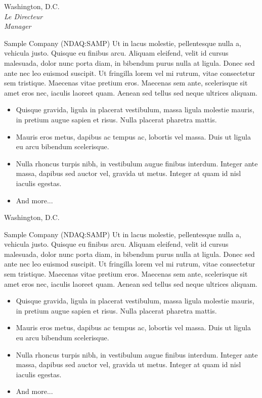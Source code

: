 \documentclass[letterpaper,10pt,final]{memoir}
\begin{document}
{ \hfill Washington, D.C.\\
\vspace{0mm}
		\textit{\hspace{5mm} Le Directeur}\\
\vspace{0mm}
        \textit{\hspace{5mm} Manager}\\
\par Sample Company (NDAQ:SAMP) Ut in lacus molestie, pellentesque nulla a, vehicula justo. Quisque eu finibus arcu. Aliquam eleifend, velit id cursus malesuada, dolor nunc porta diam, in bibendum purus nulla at ligula. Donec sed ante nec leo euismod suscipit. Ut fringilla lorem vel mi rutrum, vitae consectetur sem tristique. Maecenas vitae pretium eros. Maecenas sem ante, scelerisque sit amet eros nec, iaculis laoreet quam. Aenean sed tellus sed neque ultrices aliquam.
\begin{itemize}
\item Quisque gravida, ligula in placerat vestibulum, massa ligula molestie mauris, in pretium augue sapien et risus. Nulla placerat pharetra mattis.
\item Mauris eros metus, dapibus ac tempus ac, lobortis vel massa. Duis ut ligula eu arcu bibendum scelerisque.
\item Nulla rhoncus turpis nibh, in vestibulum augue finibus interdum. Integer ante massa, dapibus sed auctor vel, gravida ut metus. Integer at quam id nisl iaculis egestas.
\item And more...
\end{itemize}
\SmallSep

 \hfill Washington, D.C.\\
\par Sample Company (NDAQ:SAMP) Ut in lacus molestie, pellentesque nulla a, vehicula justo. Quisque eu finibus arcu. Aliquam eleifend, velit id cursus malesuada, dolor nunc porta diam, in bibendum purus nulla at ligula. Donec sed ante nec leo euismod suscipit. Ut fringilla lorem vel mi rutrum, vitae consectetur sem tristique. Maecenas vitae pretium eros. Maecenas sem ante, scelerisque sit amet eros nec, iaculis laoreet quam. Aenean sed tellus sed neque ultrices aliquam.
\begin{itemize}
\item Quisque gravida, ligula in placerat vestibulum, massa ligula molestie mauris, in pretium augue sapien et risus. Nulla placerat pharetra mattis.
\item Mauris eros metus, dapibus ac tempus ac, lobortis vel massa. Duis ut ligula eu arcu bibendum scelerisque.
\item Nulla rhoncus turpis nibh, in vestibulum augue finibus interdum. Integer ante massa, dapibus sed auctor vel, gravida ut metus. Integer at quam id nisl iaculis egestas.
\item And more...
\end{itemize}
\SmallSep

\Sep
}
\end{document}
